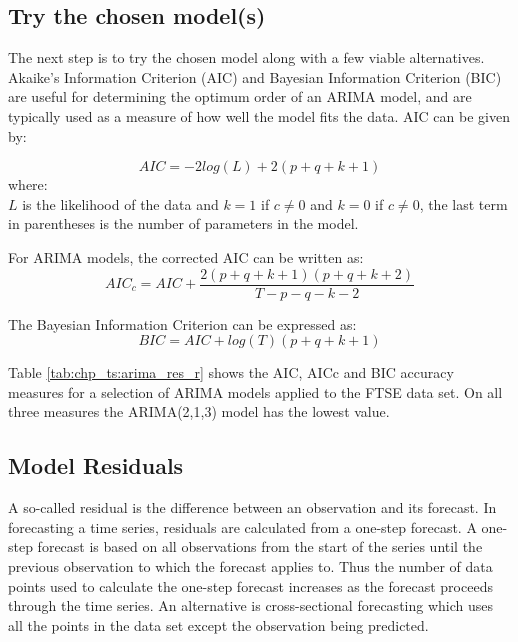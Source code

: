 \subsection{Try the chosen model(s)}
The next step is to try the chosen model along with a few viable alternatives. Akaike’s Information Criterion (AIC) and Bayesian Information Criterion (BIC) are useful for determining the optimum order of an ARIMA model, and are typically used as a measure of how well the model fits the data. AIC can be given by:

\[ AIC = -2 log (L) + 2 (p+q+k+1) \]
where:\\
$ L $ is the likelihood of the data and $ k = 1$ if $c\neq0$ and $ k=0$ if $c \neq 0$, the last term in parentheses is the number of parameters in the model.

For ARIMA models, the corrected AIC can be written as:
\[ AIC_{c} = AIC + \dfrac{2 (p+q+k+1)(p+q+k+2)}{T-p-q-k-2} \]

The Bayesian Information Criterion can be expressed as:
\[ BIC = AIC + log(T)(p+q+k+1) \]

Table \ref{tab:chp_ts:arima_res_r} shows the AIC, AICc and BIC accuracy measures for a selection of ARIMA models applied to the FTSE data set. On all three measures the ARIMA(2,1,3) model has the lowest value.



\subsection{Model Residuals}
A so-called residual is the difference between an observation and its forecast. In forecasting a time series, residuals are calculated from a one-step forecast.  A one-step forecast is based on all observations from the start of the series until the previous observation to which the forecast applies to. Thus the number of data points used to calculate the one-step forecast increases as the forecast proceeds through the time series.  An alternative is cross-sectional forecasting which uses all the points in the data set except the observation being predicted.


